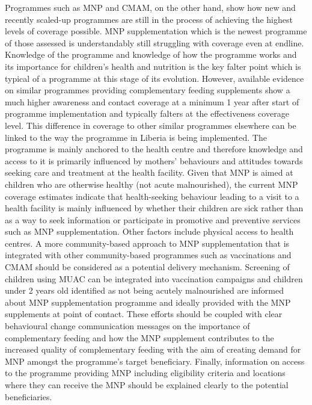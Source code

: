 \documentclass[12pt,a4paper]{article}
\begin{document}
Programmes such as MNP and CMAM, on the other hand, show how new and recently scaled-up programmes are still in the process of achieving the highest levels of coverage possible. MNP supplementation which is the newest programme of those assessed is understandably still struggling with coverage even at endline. Knowledge of the programme and knowledge of how the programme works and its importance for children's health and nutrition is the key falter point which is typical of a programme at this stage of its evolution. However, available evidence on similar programmes providing complementary feeding supplements show a much higher awareness and contact coverage at a minimum 1 year after start of programme implementation \citep{Aaron:2016cv} and typically falters at the effectiveness coverage level. This difference in coverage to other similar programmes elsewhere can be linked to the way the programme in Liberia is being implemented. The programme is mainly anchored to the health centre and therefore knowledge and access to it is primarily influenced by mothers' behaviours and attitudes towards seeking care and treatment at the health facility. Given that MNP is aimed at children who are otherwise healthy (not acute malnourished), the current MNP coverage estimates indicate that health-seeking behaviour leading to a visit to a health facility is mainly influenced by whether their children are sick rather than as a way to seek information or participate in promotive and preventive services such as MNP supplementation. Other factors include physical access to health centres. A more community-based approach to MNP supplementation that is integrated with other community-based programmes such as vaccinations and CMAM should be considered as a potential delivery mechanism. Screening of children using MUAC can be integrated into vaccination campaigns and children under 2 years old identified as not being acutely malnourished are informed about MNP supplementation programme and ideally provided with the MNP supplements at point of contact. These efforts should be coupled with clear behavioural change communication messages on the importance of complementary feeding and how the MNP supplement contributes to the increased quality of complementary feeding with the aim of creating demand for MNP amongst the programme's target beneficiary. Finally, information on access to the programme providing MNP including eligibility criteria and locations where they can receive the MNP should be explained clearly to the potential beneficiaries.
\end{document}
